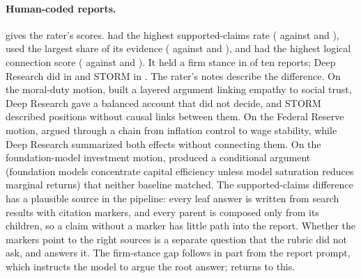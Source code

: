 \paragraph{Human-coded reports.}
 gives the rater's scores. \sys{} had the highest supported-claims rate (\humSupportedDC{} against \humSupportedOAI{} and \humSupportedStorm{}), used the largest share of its evidence (\humUtilDC{} against \humUtilOAI{} and \humUtilStorm{}), and had the highest logical connection score (\humLogicDC{} against \humLogicOAI{} and \humLogicStorm{}). It held a firm stance in \humStanceDC{} of ten reports; Deep Research did in \humStanceOAI{} and STORM in \humStanceStorm{}. The rater's notes describe the difference. On the moral-duty motion, \sys{} built a layered argument linking empathy to social trust, Deep Research gave a balanced account that did not decide, and STORM described positions without causal links between them. On the Federal Reserve motion, \sys{} argued through a chain from inflation control to wage stability, while Deep Research summarized both effects without connecting them. On the foundation-model investment motion, \sys{} produced a conditional argument (foundation models concentrate capital efficiency unless model saturation reduces marginal returns) that neither baseline matched. The supported-claims difference has a plausible source in the pipeline: every leaf answer is written from search results with citation markers, and every parent is composed only from its children, so a claim without a marker has little path into the report. Whether the markers point to the right sources is a separate question that the rubric did not ask, and  answers it. The firm-stance gap follows in part from the report prompt, which instructs the model to argue the root answer;  returns to this.

